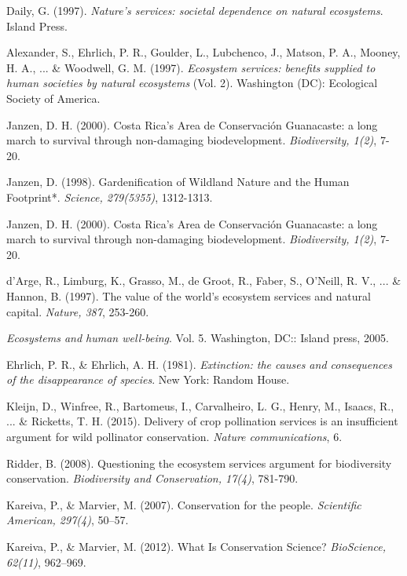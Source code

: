 \documentclass[rutwik_proposal.tex]{subfiles}
\begin{document}
\begin{thebibliography}{100}
Daily, G. 
(1997). 
\emph{Nature's services: societal dependence on natural ecosystems}. 
Island Press.

Alexander, S., Ehrlich, P. R., Goulder, L., Lubchenco, J., Matson, P. A., Mooney, H. A., ... \& Woodwell, G. M. 
(1997). 
\emph{Ecosystem services: benefits supplied to human societies by natural ecosystems} (Vol. 2). 
Washington (DC): Ecological Society of America.

Janzen, D. H. 
(2000). 
Costa Rica's Area de Conservación Guanacaste: a long march to survival through non-damaging biodevelopment. 
\emph{Biodiversity, 1(2)}, 
7-20.

Janzen, D. 
(1998). 
Gardenification of Wildland Nature and the Human Footprint*. 
\emph{Science, 279(5355)}, 
1312-1313.

Janzen, D. H. 
(2000). 
Costa Rica's Area de Conservación Guanacaste: a long march to survival through non-damaging biodevelopment. 
\emph{Biodiversity, 1(2)}, 
7-20.

d'Arge, R., Limburg, K., Grasso, M., de Groot, R., Faber, S., O'Neill, R. V., ... \& Hannon, B. 
(1997). 
The value of the world's ecosystem services and natural capital.
\emph{Nature, 387},
253-260.

\emph{Ecosystems and human well-being}. 
Vol. 5. 
Washington, DC:: Island press, 2005.

Ehrlich, P. R., \& Ehrlich, A. H. 
(1981). 
\emph{Extinction: the causes and consequences of the disappearance of species}. 
New York: Random House.

Kleijn, D., Winfree, R., Bartomeus, I., Carvalheiro, L. G., Henry, M., Isaacs, R., ... \& Ricketts, T. H. 
(2015). 
Delivery of crop pollination services is an insufficient argument for wild pollinator conservation. 
\emph{Nature communications}, 
6.

Ridder, B. 
(2008). 
Questioning the ecosystem services argument for biodiversity conservation. 
\emph{Biodiversity and Conservation, 17(4)}, 
781-790.

Kareiva, P., \& Marvier, M. 
(2007). 
Conservation for the people. 
\emph{Scientific American, 297(4)}, 
50–57.

Kareiva, P., \& Marvier, M. 
(2012). 
What Is Conservation Science? 
\emph{BioScience, 62(11)}, 
962–969.


\end{thebibliography}
\end{document}
